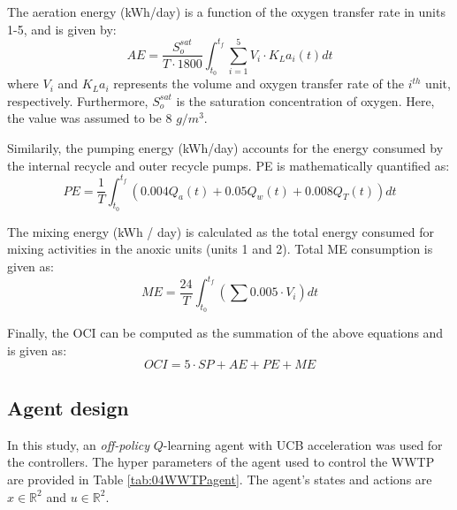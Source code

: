 The aeration energy (kWh/day) is a function of the oxygen transfer rate in units 1-5, and is given by:
\begin{equation}
    AE = \frac{S_o^{sat}}{T \cdot 1800} \int_{t_0}^{t_f} \sum\limits^5_{i = 1} V_i \cdot K_La_i (t) dt
\end{equation}
where $V_i$ and $K_La_i$ represents the volume and oxygen transfer rate of the $i^{th}$ unit, respectively. Furthermore, $S_o^{sat}$ is the saturation concentration of oxygen.  Here, the value was assumed to be 8 $g/m^3$.

Similarily, the pumping energy (kWh/day) accounts for the energy consumed by the internal recycle and outer recycle pumps.  PE is mathematically quantified as:
\begin{equation}
    PE = \frac{1}{T} \int_{t_0}^{t_f} (0.004 Q_a(t) + 0.05 Q_w(t) + 0.008 Q_T(t)) dt
\end{equation}

The mixing energy (kWh / day) is calculated as the total energy consumed for mixing activities in the anoxic units (units 1 and 2). Total ME consumption is given as:
\begin{equation}
    ME = \frac{24}{T} \int_{t_0}^{t_f} \left(\sum 0.005 \cdot V_i \right) dt
\end{equation}


Finally, the OCI can be computed as the summation of the above equations and is given as:
\begin{equation}
    OCI = 5 \cdot SP + AE + PE + ME
\end{equation}

\subsection{Agent design}
In this study, an \textit{off-policy} $Q$-learning agent with UCB acceleration was used for the controllers.  The hyper parameters of the agent used to control the WWTP are provided in Table \ref{tab:04WWTPagent}. The agent's states and actions are $x \in \mathbb{R}^2$ and $u \in \mathbb{R}^2$. 

